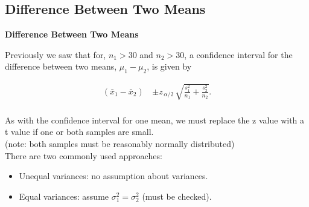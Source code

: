 \documentclass[compress]{beamer}        %
\makeatletter
\newcommand{\tcb}{\textcolor{beamer@blendedblue}}
\makeatother
\begin{document}
\subsection{Difference Between Two Means}
\begin{frame}{\bf \tcb{Difference Between Two Means}}

Previously we saw that for, $n_1>30$ and $n_2 >30$, a confidence interval for the difference between two means, $\mu_1 - \mu_2$, is given by

\begin{align*}
(\bar x_1 - \bar x_2) \, &\pm z_{\,\alpha/2}\,\sqrt{\frac{s_1^2}{n_1}+\frac{s_2^2}{n_2}}.\\[-0.3cm]
\end{align*}

As with the confidence interval for one mean, we must replace the z value with a t value if one or both samples are small.\\[0.1cm]
{\footnotesize(note: both samples must be reasonably normally distributed)}\\[0.6cm]

There are two commonly used approaches:\\[-0.1cm]
\begin{itemize}\itemsep0.2cm
\item Unequal variances: no assumption about variances.
\item Equal variances: assume $\sigma_1^2 = \sigma_2^2$ (must be checked).
\end{itemize}

\end{frame}
\end{document}

